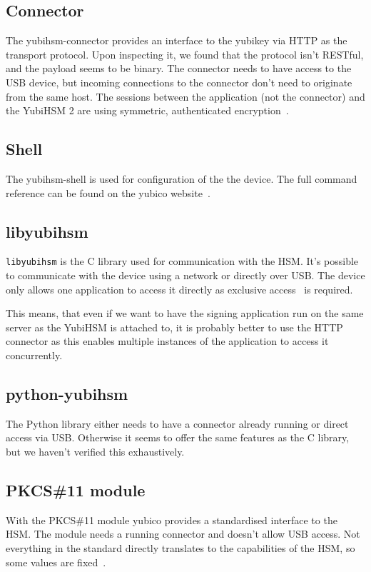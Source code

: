 \subsection{Connector}\label{subsec:connector}
The yubihsm-connector provides an interface to the yubikey via \gls{HTTP} as the transport protocol.
Upon inspecting it, we found that the protocol isn't \gls{REST}ful, and the payload seems to be binary.
The connector needs to have access to the \gls{USB} device, but incoming connections to the connector don't need to originate from the same host.
The sessions between the application (not the connector) and the YubiHSM 2 are using symmetric, authenticated encryption~\cite{yubihsm}.

\subsection{Shell}\label{subsec:shell}
The yubihsm-shell is used for configuration of the the device.
The full command reference can be found on the yubico website~\cite{yubihsm-shell}.

\subsection{libyubihsm}\label{subsec:libyubihsm}
\texttt{libyubihsm} is the C library used for communication with the \gls{HSM}.
It's possible to communicate with the device using a network or directly over \gls{USB}.
The device only allows one application to access it directly as exclusive access~\cite{libyubihsm} is required.

This means,
that even if we want to have the signing application run on the same server as the YubiHSM is attached to,
it is probably better to use the \gls{HTTP} connector as this enables multiple instances of the application to access it concurrently.

\subsection{python-yubihsm}\label{subsec:python-yubihsm}
The Python library either needs to have a connector already running or direct access via \gls{USB}.
Otherwise it seems to offer the same features as the C library, but we haven't verified this exhaustively.

\subsection{\gls{PKCS}\#11 module}\label{subsec:gls11-module}
With the \gls{PKCS}\#11 module yubico provides a standardised interface to the \gls{HSM}.
The module needs a running connector and doesn't allow \gls{USB} access.
Not everything in the standard directly translates to the capabilities of the \gls{HSM},
so some values are fixed~\cite{yubihsm-pkcs11}.

